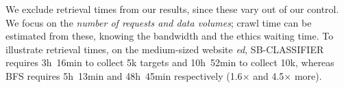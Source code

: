 We
exclude retrieval times from our results, 
since these vary out of our control. 
We focus on the \emph{number of requests and data volumes}; crawl time
can be estimated from these, knowing the bandwidth and the ethics waiting
time. To illustrate retrieval times, on the medium-sized website
\emph{ed}, \textsf{\small SB-CLASSIFIER} requires 3h~16min to collect 5k
targets and 10h~52min to collect 10k, whereas \textsf{\small BFS} requires
5h~13min and 48h~45min respectively (1.6$\times$ and 4.5$\times$ more).
